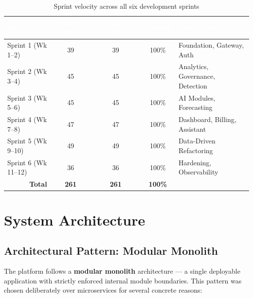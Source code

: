 \documentclass[12pt,a4paper,twoside]{report}
\begin{document}
\begin{table}[H]
\centering
\begin{tabularx}{\textwidth}{|l|c|c|c|X|}
\hline
\rowcolor{tabheader}
\textcolor{white}{\textbf{Sprint}} &
\textcolor{white}{\textbf{Planned SP}} &
\textcolor{white}{\textbf{Completed SP}} &
\textcolor{white}{\textbf{Velocity}} &
\textcolor{white}{\textbf{Focus Area}} \\
\hline
Sprint 1 (Wk 1--2) & 39 & 39 & 100\% & Foundation, Gateway, Auth \\
\hline
Sprint 2 (Wk 3--4) & 45 & 45 & 100\% & Analytics, Governance, Detection \\
\hline
Sprint 3 (Wk 5--6) & 45 & 45 & 100\% & AI Modules, Forecasting \\
\hline
Sprint 4 (Wk 7--8) & 47 & 47 & 100\% & Dashboard, Billing, Assistant \\
\hline
Sprint 5 (Wk 9--10) & 49 & 49 & 100\% & Data-Driven Refactoring \\
\hline
Sprint 6 (Wk 11--12) & 36 & 36 & 100\% & Hardening, Observability \\
\hline
\multicolumn{1}{|r|}{\textbf{Total}} & \textbf{261} & \textbf{261} & \textbf{100\%} & \\
\hline
\end{tabularx}
\caption{Sprint velocity across all six development sprints}
\end{table}



\chapter{System Architecture}

\section{Architectural Pattern: Modular Monolith}

The platform follows a \textbf{modular monolith} architecture — a single deployable application with strictly enforced internal module boundaries. This pattern was chosen deliberately over microservices for several concrete reasons:
\end{document}

